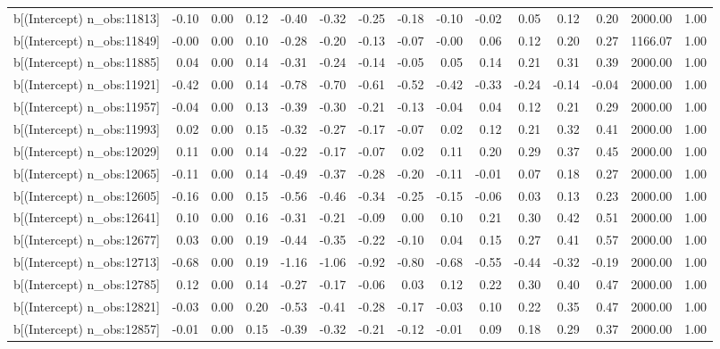 \begin{table}[ht]
\begin{tabular}{rrrrrrrrrrrrrrr}
  b[(Intercept) n\_obs:11813] & -0.10 & 0.00 & 0.12 & -0.40 & -0.32 & -0.25 & -0.18 & -0.10 & -0.02 & 0.05 & 0.12 & 0.20 & 2000.00 & 1.00 \\ 
  b[(Intercept) n\_obs:11849] & -0.00 & 0.00 & 0.10 & -0.28 & -0.20 & -0.13 & -0.07 & -0.00 & 0.06 & 0.12 & 0.20 & 0.27 & 1166.07 & 1.00 \\ 
  b[(Intercept) n\_obs:11885] & 0.04 & 0.00 & 0.14 & -0.31 & -0.24 & -0.14 & -0.05 & 0.05 & 0.14 & 0.21 & 0.31 & 0.39 & 2000.00 & 1.00 \\ 
  b[(Intercept) n\_obs:11921] & -0.42 & 0.00 & 0.14 & -0.78 & -0.70 & -0.61 & -0.52 & -0.42 & -0.33 & -0.24 & -0.14 & -0.04 & 2000.00 & 1.00 \\ 
  b[(Intercept) n\_obs:11957] & -0.04 & 0.00 & 0.13 & -0.39 & -0.30 & -0.21 & -0.13 & -0.04 & 0.04 & 0.12 & 0.21 & 0.29 & 2000.00 & 1.00 \\ 
  b[(Intercept) n\_obs:11993] & 0.02 & 0.00 & 0.15 & -0.32 & -0.27 & -0.17 & -0.07 & 0.02 & 0.12 & 0.21 & 0.32 & 0.41 & 2000.00 & 1.00 \\ 
  b[(Intercept) n\_obs:12029] & 0.11 & 0.00 & 0.14 & -0.22 & -0.17 & -0.07 & 0.02 & 0.11 & 0.20 & 0.29 & 0.37 & 0.45 & 2000.00 & 1.00 \\ 
  b[(Intercept) n\_obs:12065] & -0.11 & 0.00 & 0.14 & -0.49 & -0.37 & -0.28 & -0.20 & -0.11 & -0.01 & 0.07 & 0.18 & 0.27 & 2000.00 & 1.00 \\ 
  b[(Intercept) n\_obs:12605] & -0.16 & 0.00 & 0.15 & -0.56 & -0.46 & -0.34 & -0.25 & -0.15 & -0.06 & 0.03 & 0.13 & 0.23 & 2000.00 & 1.00 \\ 
  b[(Intercept) n\_obs:12641] & 0.10 & 0.00 & 0.16 & -0.31 & -0.21 & -0.09 & 0.00 & 0.10 & 0.21 & 0.30 & 0.42 & 0.51 & 2000.00 & 1.00 \\ 
  b[(Intercept) n\_obs:12677] & 0.03 & 0.00 & 0.19 & -0.44 & -0.35 & -0.22 & -0.10 & 0.04 & 0.15 & 0.27 & 0.41 & 0.57 & 2000.00 & 1.00 \\ 
  b[(Intercept) n\_obs:12713] & -0.68 & 0.00 & 0.19 & -1.16 & -1.06 & -0.92 & -0.80 & -0.68 & -0.55 & -0.44 & -0.32 & -0.19 & 2000.00 & 1.00 \\ 
  b[(Intercept) n\_obs:12785] & 0.12 & 0.00 & 0.14 & -0.27 & -0.17 & -0.06 & 0.03 & 0.12 & 0.22 & 0.30 & 0.40 & 0.47 & 2000.00 & 1.00 \\ 
  b[(Intercept) n\_obs:12821] & -0.03 & 0.00 & 0.20 & -0.53 & -0.41 & -0.28 & -0.17 & -0.03 & 0.10 & 0.22 & 0.35 & 0.47 & 2000.00 & 1.00 \\ 
  b[(Intercept) n\_obs:12857] & -0.01 & 0.00 & 0.15 & -0.39 & -0.32 & -0.21 & -0.12 & -0.01 & 0.09 & 0.18 & 0.29 & 0.37 & 2000.00 & 1.00 \\ 

\end{tabular}
\end{table}
